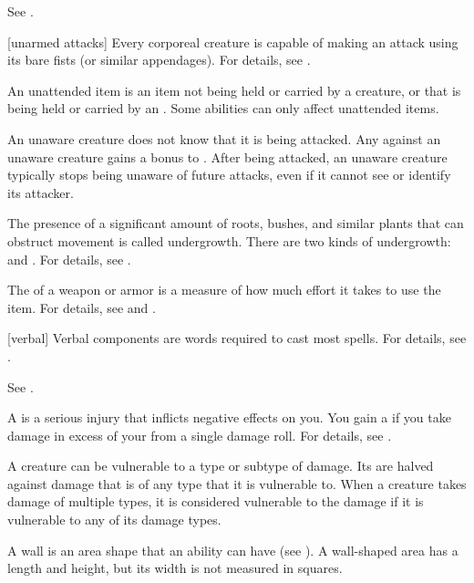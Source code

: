  See .

[unarmed attacks] Every corporeal creature is capable of making an attack using its bare fists (or similar appendages).
For details, see .

 An unattended item is an item not being held or carried by a creature, or that is being held or carried by an .
Some abilities can only affect unattended items.

 An unaware creature does not know that it is being attacked.
Any  against an unaware creature gains a  bonus to .
After being attacked, an unaware creature typically stops being unaware of future attacks, even if it cannot see or identify its attacker.

 The presence of a significant amount of roots, bushes, and similar plants that can obstruct movement is called undergrowth.
There are two kinds of undergrowth:  and .
For details, see .

 The  of a weapon or armor is a measure of how much effort it takes to use the item.
For details, see  and .

[verbal] Verbal components are words required to cast most spells.
For details, see .

 See .

 A  is a serious injury that inflicts negative effects on you.
You gain a  if you take damage in excess of your  from a single damage roll.
For details, see .

 A creature can be vulnerable to a type or subtype of damage.
Its  are halved against damage that is of any type that it is vulnerable to.
When a creature takes damage of multiple types, it is considered vulnerable to the damage if it is vulnerable to any of its damage types.

 A wall is an area shape that an ability can have (see ).
A wall-shaped area has a length and height, but its width is not measured in squares.

